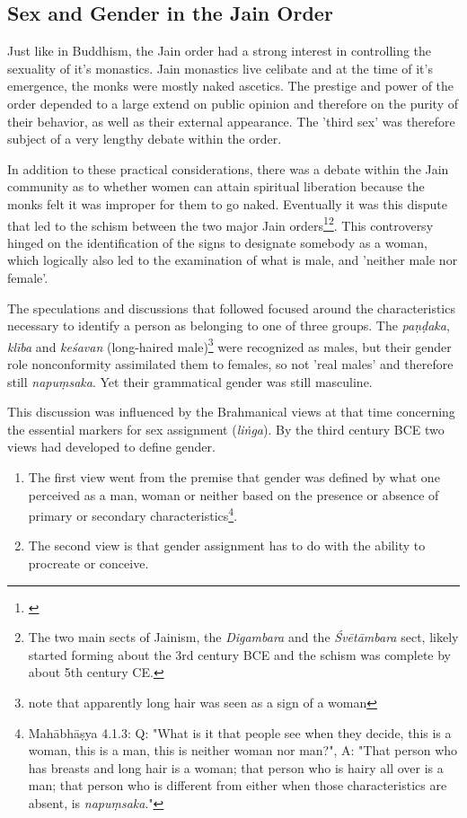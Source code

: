 \subsection{Sex and Gender in the Jain Order}
Just like in Buddhism, the Jain order had a strong interest in controlling the sexuality of it's monastics. Jain monastics live celibate and at the time of it's emergence, the monks were mostly naked ascetics. The prestige and power of the order depended to a large extend on public opinion and therefore on the purity of their behavior, as well as their external appearance. The 'third sex' was therefore subject of a very lengthy debate within the order. 

In addition to these practical considerations, there was a debate within the Jain community as to whether women can attain spiritual liberation because the monks felt it was improper for them to go naked. Eventually it was this dispute that led to the schism between the two major Jain orders\footnote{\cite{dudas}}\footnote{The two main sects of Jainism, the {\em Digambara} and the {\em Śvētāmbara} sect, likely started forming about the 3rd century BCE and the schism was complete by about 5th century CE.}. This controversy hinged on the identification of the signs to designate somebody as a woman, which logically also led to the examination of what is male, and 'neither male nor female'. 

The speculations and discussions that followed focused around the characteristics necessary to identify a person as belonging to one of three groups. The {\em paṇḍaka}, {\em klība} and {\em keśavan} (long-haired male)\footnote{note that apparently long hair was seen as a sign of a woman} were recognized as males, but their gender role nonconformity assimilated them to females, so not 'real males' and therefore still {\em napuṃsaka}. Yet their grammatical gender was still masculine.

This discussion was influenced by the Brahmanical views at that time concerning the essential markers for sex assignment ({\em liṅga}). By the third century BCE two views had developed to define gender.
\begin{enumerate}
 \item The first view went from the premise that gender was defined by what one perceived as a man, woman or neither based on the presence or absence of primary or secondary characteristics\footnote{Mahābhāṣya 4.1.3: Q: "What is it that people see when they decide, this is a woman, this is a man, this is neither woman nor man?", A: "That person who has breasts and long hair is a woman; that person who is hairy all over is a man; that person who is different from either when those characteristics are absent, is {\em napuṃsaka}."}.
 \item The second view is that gender assignment has to do with the ability to procreate or conceive. 
\end{enumerate}

